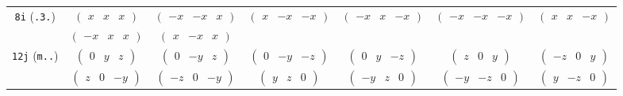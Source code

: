 \documentclass[fleqn,9pt,landscape]{jsarticle}
\begin{document}
\begin{center}
\begin{longtable}{ccccccc}
{\tt 8i} ({\tt .3.}) & $ \begin{pmatrix} x & x & x \end{pmatrix} $ & $ \begin{pmatrix} - x & - x & x \end{pmatrix} $ & $ \begin{pmatrix} x & - x & - x \end{pmatrix} $ & $ \begin{pmatrix} - x & x & - x \end{pmatrix} $ & $ \begin{pmatrix} - x & - x & - x \end{pmatrix} $ & $ \begin{pmatrix} x & x & - x \end{pmatrix} $ \\
& $ \begin{pmatrix} - x & x & x \end{pmatrix} $ & $ \begin{pmatrix} x & - x & x \end{pmatrix} $ & $  $ & $  $ & $  $ & $  $ \\ \hline
{\tt 12j} ({\tt m..}) & $ \begin{pmatrix} 0 & y & z \end{pmatrix} $ & $ \begin{pmatrix} 0 & - y & z \end{pmatrix} $ & $ \begin{pmatrix} 0 & - y & - z \end{pmatrix} $ & $ \begin{pmatrix} 0 & y & - z \end{pmatrix} $ & $ \begin{pmatrix} z & 0 & y \end{pmatrix} $ & $ \begin{pmatrix} - z & 0 & y \end{pmatrix} $ \\
& $ \begin{pmatrix} z & 0 & - y \end{pmatrix} $ & $ \begin{pmatrix} - z & 0 & - y \end{pmatrix} $ & $ \begin{pmatrix} y & z & 0 \end{pmatrix} $ & $ \begin{pmatrix} - y & z & 0 \end{pmatrix} $ & $ \begin{pmatrix} - y & - z & 0 \end{pmatrix} $ & $ \begin{pmatrix} y & - z & 0 \end{pmatrix} $ \\ \hline

\end{longtable}
\end{center}
\end{document}
